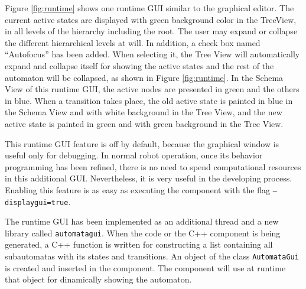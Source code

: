 \documentclass[journal,twoside]{JoPhA}
\begin{document}
Figure \ref{fig:runtime} shows one runtime GUI similar to the graphical editor. %
The current active states are displayed with green background color in the TreeView, in all levels of the hierarchy including the root. The user may expand or collapse the different hierarchical levels at will. In addition, a check box named “Autofocus” has been added. When selecting it, the Tree View will automatically expand and collapse itself for showing the active states and the rest of the automaton will be collapsed, as shown in Figure \ref{fig:runtime}. In the Schema View of this runtime GUI, the active nodes are presented in green and the others in blue. When a transition takes place, the old active state is painted in blue in the Schema View and with white background in the Tree View, and the new active state is painted in green and with green background in the Tree View.

This runtime GUI feature is off by default, because the graphical window is useful only for debugging. In normal robot operation, once its behavior programming has been refined, there is no need to spend computational resources in this additional GUI. Nevertheless, it is very useful in the developing process. Enabling this feature is as easy as executing the component with the flag \texttt{--displaygui=true}. 

The runtime GUI has been implemented as an additional thread and a new library called \texttt{automatagui}. %
When the code or the C++ component is being generated, a C++ function is written for constructing a list containing all subautomatas with its states and transitions. An object of the class \texttt{AutomataGui} is created and inserted in the component. The component will use at runtime that object for dinamically showing the automaton. %
\end{document}
